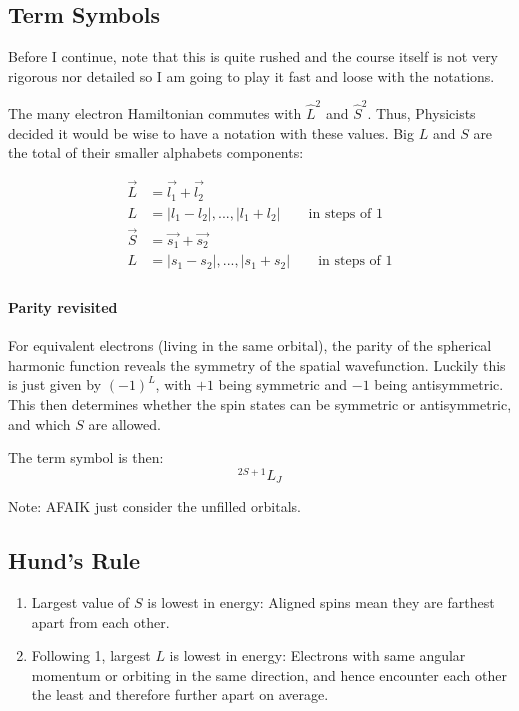 \documentclass[12pt]{article}
\begin{document}
\subsection{Term Symbols}
Before I continue, note that this is quite rushed and the course itself is not very rigorous nor detailed so I am going to play it fast and loose with the notations.

The many electron Hamiltonian commutes with $\hat{L}^2$ and $\hat{S}^2$. Thus, Physicists decided it would be wise to have a notation with these values. Big $L$ and $S$ are the total of their smaller alphabets components:

\begin{align*}
    \vec{L} &= \vec{l_1}+\vec{l_2}\\
    L &= |l_1 - l_2|,...,|l_1+l_2| \qquad \text{in steps of 1}\\
    \vec{S} &= \vec{s_1}+\vec{s_2}\\
    L &= |s_1 - s_2|,...,|s_1+s_2| \qquad \text{in steps of 1}\\
\end{align*}


\paragraph{Parity revisited}
For equivalent electrons (living in the same orbital), the parity of the spherical harmonic function reveals the symmetry of the spatial wavefunction. Luckily this is just given by $(-1)^L$, with $+1$ being symmetric and $-1$ being antisymmetric. This then determines whether the spin states can be symmetric or antisymmetric, and which $S$ are allowed. 

The term symbol is then:
\[ ^{2S+1}L_J\]

Note: AFAIK just consider the unfilled orbitals. 

\subsection{Hund's Rule}
\begin{enumerate}
    \item Largest value of $S$ is lowest in energy: Aligned spins mean they are farthest apart from each other.
    \item Following 1, largest $L$ is lowest in energy: Electrons with same angular momentum or orbiting in the same direction, and hence encounter each other the least and therefore further apart on average.
\end{enumerate}
\end{document}
